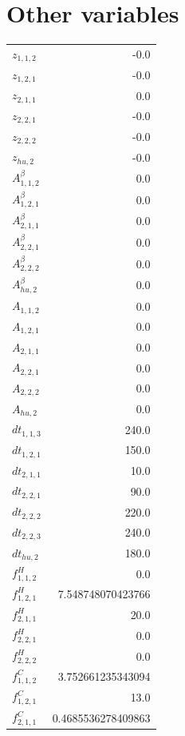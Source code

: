 \documentclass{article}%
\makeatletter
\let\mcnewpage=\newpage%
\newcommand{\TrickSupertabularIntoMulticols}{%
\renewcommand\newpage{%
\if@firstcolumn%
\hrule width\linewidth height0pt%
\columnbreak%
\else%
\mcnewpage%
\fi%
}%
}%
\makeatother
\begin{document}
\section{Other variables}%
\thispagestyle{plain}%
\begin{multicols*}{3}%
\TrickSupertabularIntoMulticols%
%
\begin{supertabular}{lr}%
	$z_{1,1,2}$ & -0.0 \\%
	$z_{1,2,1}$ & -0.0 \\%
	$z_{2,1,1}$ & 0.0 \\%
	$z_{2,2,1}$ & -0.0 \\%
	$z_{2,2,2}$ & -0.0 \\%
	$z_{hu,2}$ & -0.0 \\%
	$A_{1,1,2}^{\beta}$ & 0.0 \\%
	$A_{1,2,1}^{\beta}$ & 0.0 \\%
	$A_{2,1,1}^{\beta}$ & 0.0 \\%
	$A_{2,2,1}^{\beta}$ & 0.0 \\%
	$A_{2,2,2}^{\beta}$ & 0.0 \\%
	$A_{hu,2}^{\beta}$ & 0.0 \\%
	$A_{1,1,2}$ & 0.0 \\%
	$A_{1,2,1}$ & 0.0 \\%
	$A_{2,1,1}$ & 0.0 \\%
	$A_{2,2,1}$ & 0.0 \\%
	$A_{2,2,2}$ & 0.0 \\%
	$A_{hu,2}$ & 0.0 \\%
	$dt_{1,1,3}$ & 240.0 \\%
	$dt_{1,2,1}$ & 150.0 \\%
	$dt_{2,1,1}$ & 10.0 \\%
	$dt_{2,2,1}$ & 90.0 \\%
	$dt_{2,2,2}$ & 220.0 \\%
	$dt_{2,2,3}$ & 240.0 \\%
	$dt_{hu,2}$ & 180.0 \\%
	$f_{1,1,2}^{H}$ & 0.0 \\%
	$f_{1,2,1}^{H}$ & 7.548748070423766 \\%
	$f_{2,1,1}^{H}$ & 20.0 \\%
	$f_{2,2,1}^{H}$ & 0.0 \\%
	$f_{2,2,2}^{H}$ & 0.0 \\%
	$f_{1,1,2}^{C}$ & 3.752661235343094 \\%
	$f_{1,2,1}^{C}$ & 13.0 \\%
	$f_{2,1,1}^{C}$ & 0.4685536278409863 \\%

\end{supertabular}
\end{multicols*}
\end{document}
